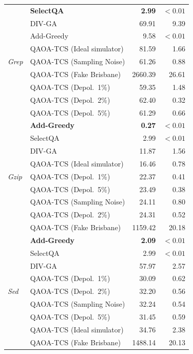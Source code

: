 \begin{table}[ht]
\begin{tabular}{llrr}
\multirow{9}{*}{\textit{Grep}}
& \textbf{SelectQA}                    & \textbf{2.99}   & $<0.01$ \\
& DIV-GA                               & 69.91           & 9.39    \\
& Add-Greedy                           & 9.58            & $<0.01$ \\
& QAOA-TCS (Ideal simulator)           & 81.59           & 1.66    \\
& QAOA-TCS (Sampling Noise)            & 61.26           & 0.88    \\
& QAOA-TCS (Fake Brisbane)             & 2660.39         & 26.61   \\
& QAOA-TCS (Depol.\ 1\%)              & 59.35           & 1.48    \\
& QAOA-TCS (Depol.\ 2\%)              & 62.40           & 0.32    \\
& QAOA-TCS (Depol.\ 5\%)              & 61.29           & 0.66    \\
\midrule

\multirow{9}{*}{\textit{Gzip}}
& \textbf{Add-Greedy}                  & \textbf{0.27}   & $<0.01$ \\
& SelectQA                             & 2.99            & $<0.01$ \\
& DIV-GA                               & 11.87           & 1.56    \\
& QAOA-TCS (Ideal simulator)           & 16.46           & 0.78    \\
& QAOA-TCS (Depol.\ 1\%)              & 22.37           & 0.41    \\
& QAOA-TCS (Depol.\ 5\%)              & 23.49           & 0.38    \\
& QAOA-TCS (Sampling Noise)            & 24.11           & 0.80    \\
& QAOA-TCS (Depol.\ 2\%)              & 24.31           & 0.52    \\
& QAOA-TCS (Fake Brisbane)             & 1159.42         & 20.18   \\
\midrule

\multirow{9}{*}{\textit{Sed}}
& \textbf{Add-Greedy}                  & \textbf{2.09}   & $<0.01$ \\
& SelectQA                             & 2.99            & $<0.01$ \\
& DIV-GA                               & 57.97           & 2.57    \\
& QAOA-TCS (Depol.\ 1\%)              & 30.09           & 0.62    \\
& QAOA-TCS (Depol.\ 2\%)              & 32.20           & 0.56    \\
& QAOA-TCS (Sampling Noise)            & 32.24           & 0.54    \\
& QAOA-TCS (Depol.\ 5\%)              & 31.45           & 0.59    \\
& QAOA-TCS (Ideal simulator)           & 34.76           & 2.38    \\
& QAOA-TCS (Fake Brisbane)             & 1488.14         & 20.13   \\

\bottomrule
\end{tabular}
\end{table}

